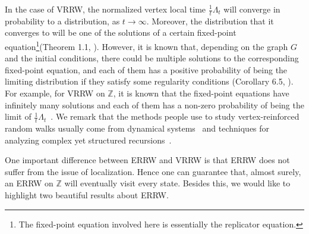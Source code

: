 \documentclass[a4paper, 11pt]{article}
\begin{document}
In the case of VRRW, the normalized vertex local time
$\frac{1}{t}\Lambda_t$
will converge in probability to a distribution, as $t \to \infty$. Moreover, the distribution that it converges to will be one of the solutions of a certain fixed-point equation\footnote{The fixed-point equation involved here is essentially the replicator equation.}(Theorem 1.1, \cite{benaim}). However, it is known that, depending on the graph $G$ and the initial conditions, there could be multiple solutions to the corresponding fixed-point equation, and each of them has a positive probability of being the limiting distribution if they satisfy some regularity conditions (Corollary 6.5, \cite{benaim}). For example, for VRRW on $\mathbb{Z}$, it is known that the fixed-point equations have infinitely many solutions and each of them has a non-zero probability of being the limit of 
$\frac{1}{t}\Lambda_t$~\cite{tarres}. We remark that the methods people use to study vertex-reinforced random walks usually come from dynamical systems~\cite{benaim} 
and techniques for analyzing complex yet structured recursions~\cite{tarres}.

One important difference between ERRW and VRRW is that ERRW does not suffer from the issue of localization. Hence one can guarantee that, almost surely, an ERRW on $\mathbb{Z}$ will eventually visit every state. Besides this, we would like to highlight two beautiful results about ERRW.
\end{document}
